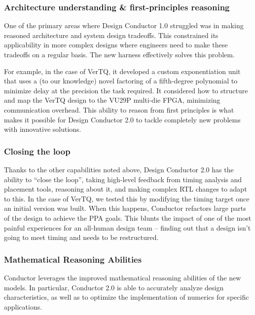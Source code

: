 \subsubsection{Architecture understanding \& first-principles reasoning}

One of the primary areas where Design Conductor 1.0 struggled was in making reasoned architecture and system design tradeoffs. This constrained its applicability in more complex designs where engineers need to make these tradeoffs on a regular basis. The new harness effectively solves this problem.

For example, in the case of VerTQ, it developed a custom exponentiation unit that uses a (to our knowledge) novel factoring of a fifth-degree polynomial to minimize delay at the precision the task required. It considered how to structure and map the VerTQ design to the VU29P multi-die FPGA, minimizing communication overhead. This ability to reason from first principles is what makes it possible for Design Conductor 2.0 to tackle completely new problems with innovative solutions.

\subsubsection{Closing the loop}

Thanks to the other capabilities noted above, Design Conductor 2.0 has the ability to ``close the loop'', taking high-level feedback from timing analysis and placement tools, reasoning about it, and making complex RTL changes to adapt to this. In the case of VerTQ, we tested this by modifying the timing target once an initial version was built. When this happens, Conductor refactors large parts of the design to achieve the PPA goals. This blunts the impact of one of the most painful experiences for an all-human design team -- finding out that a design isn't going to meet timing and needs to be restructured.

\subsubsection{Mathematical Reasoning Abilities}

Conductor leverages the improved mathematical reasoning abilities of the new models. In particular, Conductor 2.0 is able to accurately analyze design characteristics, as well as to optimize the implementation of numerics for specific applications.

